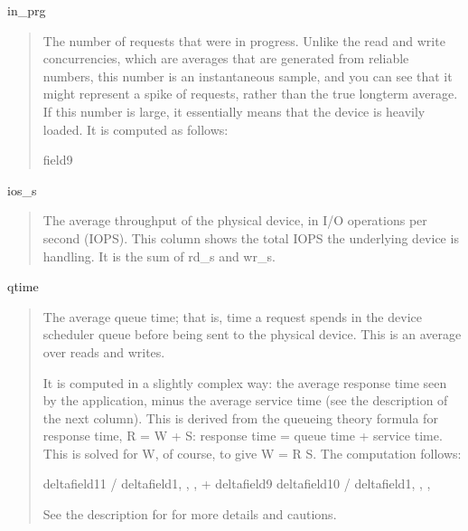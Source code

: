 \documentclass[letterpaper,10pt,english]{sphinxmanual}
\begin{document}
\sphinxAtStartPar
in\_prg
\begin{quote}

\sphinxAtStartPar
The number of requests that were in progress.  Unlike the read and write
concurrencies, which are averages that are generated from reliable numbers, this
number is an instantaneous sample, and you can see that it might represent a
spike of requests, rather than the true long\sphinxhyphen{}term average.  If this number is
large, it essentially means that the device is heavily loaded.  It is computed
as follows:

\begin{sphinxVerbatim}[commandchars=\\\{\}]
field9
\end{sphinxVerbatim}
\end{quote}

\sphinxAtStartPar
ios\_s
\begin{quote}

\sphinxAtStartPar
The average throughput of the physical device, in I/O operations per second
(IOPS).  This column shows the total IOPS the underlying device is handling.  It
is the sum of rd\_s and wr\_s.
\end{quote}

\sphinxAtStartPar
qtime
\begin{quote}

\sphinxAtStartPar
The average queue time; that is, time a request spends in the device scheduler
queue before being sent to the physical device.  This is an average over reads
and writes.

\sphinxAtStartPar
It is computed in a slightly complex way: the average response time seen by the
application, minus the average service time (see the description of the next
column).  This is derived from the queueing theory formula for response time, R
= W + S: response time = queue time + service time.  This is solved for W, of
course, to give W = R \sphinxhyphen{} S.  The computation follows:

\begin{sphinxVerbatim}[commandchars=\\\{\}]
delta\PYG{o}{[}field11\PYG{o}{]} / delta\PYG{o}{[}field1, , , \PYG{o}{]} + delta\PYG{o}{[}field9\PYG{o}{]}
   \PYGZhy{} delta\PYG{o}{[}field10\PYG{o}{]} / delta\PYG{o}{[}field1, , , \PYG{o}{]}
\end{sphinxVerbatim}

\sphinxAtStartPar
See the description for  for more details and cautions.
\end{quote}
\end{document}

